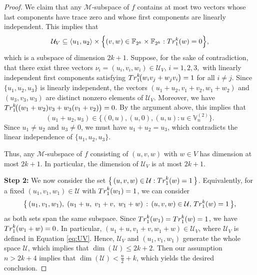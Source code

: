 \documentclass[10pt,a4paper]{amsart}
\newcommand{\Tr}{{\rm Tr}}
\newcommand{\V}{\mathbb{V}}
\begin{document}
\begin{proof}
		We claim that any $\mathcal{M}$-subspace of $f$ contains at most two vectors whose last components have trace zero and whose first components are linearly independent.
		This implies that
		\begin{align*}
			\mathcal{U}_V
			\subseteq
			\langle u_1,u_2\rangle
			\times
			\Bigl\{(v,w)\in \mathbb{F}_{2^k}\times \mathbb{F}_{2^k} :
			\Tr_1^k(w)=0
			\Bigr\},
		\end{align*}
		which is a subspace of dimension \(2k+1\).
		Suppose, for the sake of contradiction, that there exist three vectors \(\nu_i=(u_i,v_i,w_i) \in \mathcal{U}_V\), \(i=1,2,3,\) with linearly independent first components satisfying $\Tr_1^k\!\bigl(w_i v_j+w_j v_i\bigr)=1$ for all $i\neq j$.
		Since \(\{u_1,u_2,u_3\}\) is linearly independent, the vectors
		\((u_1+u_2,v_1+v_2,w_1+w_2)\) and
		\((u_3,v_3,w_3)\)
		are distinct nonzero elements of $\mathcal{U}_V$. 
		Moreover, we have $\Tr_1^k\!\bigl((w_1+w_2)v_3+w_3(v_1+v_2)\bigr)=0$.
		By the argument above, this implies that
		\[
		(u_1+u_2,u_3)\in \{(0,u),(u,0),(u,u):u\in \V_n^{(2)}\}.
		\]
		Since \(u_1\neq u_2\) and \(u_3\neq 0\), we must have \(u_1+u_2=u_3\),
		which contradicts the linear independence of \(\{u_1,u_2,u_3\}\).
		
		Thus, any \(\mathcal{M}\)-subspace of \(f\) consisting of 
		\((u,v,w)\) with \(w\in V\) has dimension at most \(2k+1\). In particular, the dimension of $\mathcal{U}_V$ is at most \(2k+1\).
		
		\medskip
		\noindent\textbf{Step 2:}  
		We now consider the set $\bigl\{\, (u,v,w) \in \mathcal{U} : \Tr_1^k(w)=1 \,\bigr\}$. 
		Equivalently, for a fixed $(u_1,v_1,w_1)\in\mathcal{U} $ with $\Tr_1^k(w_1)=1$, we can consider  
		\[
		\bigl\{\, (u_1,v_1,w_1),\; (u_1+u,\;v_1+v,\;w_1+w) \, : \, (u,v,w)\in \mathcal{U}, \, \Tr_1^k(w)=1 \,\bigr\},
		\]
		as both sets span the same subspace.
		Since \(\Tr_1^k(w_1)=\Tr_1^k(w)=1\), we have \(\Tr_1^k(w_1+w)=0\).  
		In particular,  
		\((u_1+u,v_1+v,w_1+w)\in \mathcal{U}_V\), 
		where \(\mathcal{U}_V\) is defined in Equation \eqref{eq:UV}.  
		Hence, \(\mathcal{U}_V\) and \((u_1,v_1,w_1)\) generate the whole space \(\mathcal{U}\), which implies that 
		\(\dim (\mathcal{U})\leq 2k+2\). Then our assumption $n > 2k + 4$ implies that $\dim(\mathcal U) < \tfrac{n}{2} + k$,
		which yields the desired conclusion.
	\end{proof}
\end{document}
